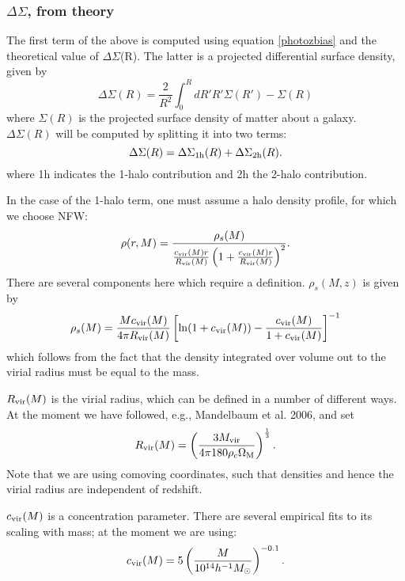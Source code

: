 \documentclass[onecolumn,amsmath,aps,fleqn, superscriptaddress]{revtex4}
\begin{document}
\subsubsection{$\Delta \Sigma$, from theory}
The first term of the above is computed using equation \ref{photozbias} and the theoretical value of $\Delta \Sigma$(R). The latter is a projected differential surface density, given by
\begin{equation}
\Delta \Sigma(R) = \frac{2}{R^2} \int_0^R dR' R' \Sigma(R') - \Sigma(R)
\label{DelSigDef}
\end{equation}
where $\Sigma(R)$ is the projected surface density of matter about a galaxy. $\Delta \Sigma(R)$ will be computed by splitting it into two terms:
\begin{equation}
\Delta\Sigma(R) = \Delta\Sigma_{{\rm 1h}}(R) + \Delta \Sigma_{{\rm 2h}}(R).
\label{DeltaSigterm}
\end{equation}
where 1h indicates the 1-halo contribution and 2h the 2-halo contribution.

In the case of the 1-halo term, one must assume a halo density profile, for which we choose NFW:
\begin{equation}
\rho(r, M) = \frac{\rho_s(M)}{\frac{c_{\rm vir}(M)r}{R_{\rm vir}(M)}\left(1+\frac{c_{\rm vir}(M)r}{R_{\rm vir}(M)}\right)^2}.
\label{nfw}
\end{equation}
There are several components here which require a definition. $\rho_s(M,z)$ is given by
\begin{equation}
\rho_s(M) = \frac{Mc_{\rm vir}(M)}{4 \pi R_{\rm vir}(M)}\left[{\rm ln} (1+ c_{\rm vir}(M)) - \frac{c_{\rm vir}(M)}{1+c_{\rm vir}(M)}\right]^{-1}
\label{rhos}
\end{equation}
which follows from the fact that the density integrated over volume out to the virial radius must be equal to the  mass.

$R_{\rm vir}(M)$ is the virial radius, which can be defined in a number of different ways. At the moment we have followed, e.g., Mandelbaum et al. 2006, and set
\begin{equation}
R_{\rm vir}(M) = \left(\frac{3 M_{\rm vir}}{4 \pi 180 \rho_c \Omega_{\rm M}} \right)^{\frac{1}{3}}.
\label{Rvir}
\end{equation}
Note that we are using comoving coordinates, such that densities and hence the virial radius are independent of redshift.

$c_{\rm vir}(M)$ is a concentration parameter. There are several empirical fits to its scaling with mass; at the moment we are using:
\begin{equation}
c_{\rm vir}(M) = 5\left(\frac{M}{10^{14}h^{-1}M_{\odot}}\right)^{-0.1}.
\label{cvir}
\end{equation}
\end{document}
